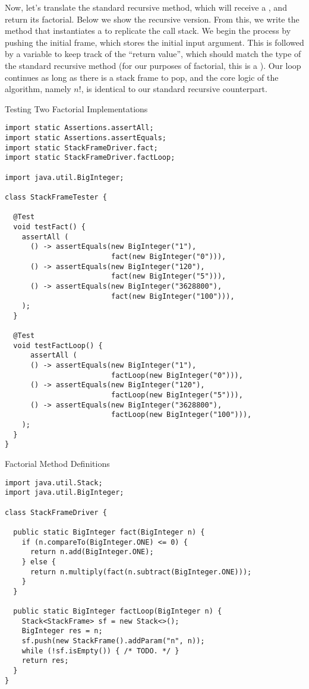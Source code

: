 Now, let's translate the standard recursive  method, which will receive a , and return its factorial. Below we show the recursive version. From this, we write the  method that instantiates a  to replicate the call stack. We begin the process by pushing the initial frame, which stores the initial input argument. This is followed by a variable to keep track of the ``return value'', which should match the type of the standard recursive method (for our purposes of factorial, this is a ). Our loop continues as long as there is a stack frame to pop, and the core logic of the algorithm, namely $n!$, is identical to our standard recursive counterpart.

\begin{cl}{Testing Two Factorial Implementations}
\begin{lstlisting}[language=MyJava]
import static Assertions.assertAll;
import static Assertions.assertEquals;
import static StackFrameDriver.fact;
import static StackFrameDriver.factLoop;

import java.util.BigInteger;

class StackFrameTester {

  @Test
  void testFact() {
    assertAll (
      () -> assertEquals(new BigInteger("1"), 
                         fact(new BigInteger("0"))),
      () -> assertEquals(new BigInteger("120"), 
                         fact(new BigInteger("5"))),
      () -> assertEquals(new BigInteger("3628800"), 
                         fact(new BigInteger("100"))),
    );
  }

  @Test
  void testFactLoop() {
      assertAll (
      () -> assertEquals(new BigInteger("1"), 
                         factLoop(new BigInteger("0"))),
      () -> assertEquals(new BigInteger("120"), 
                         factLoop(new BigInteger("5"))),
      () -> assertEquals(new BigInteger("3628800"), 
                         factLoop(new BigInteger("100"))),
    );
  }
}  
\end{lstlisting}
\end{cl}

\begin{cl}{Factorial Method Definitions}
\begin{lstlisting}[language=MyJava]
import java.util.Stack;
import java.util.BigInteger;

class StackFrameDriver {

  public static BigInteger fact(BigInteger n) {
    if (n.compareTo(BigInteger.ONE) <= 0) {
      return n.add(BigInteger.ONE);
    } else {
      return n.multiply(fact(n.subtract(BigInteger.ONE)));
    }
  }

  public static BigInteger factLoop(BigInteger n) {
    Stack<StackFrame> sf = new Stack<>();
    BigInteger res = n;
    sf.push(new StackFrame().addParam("n", n));
    while (!sf.isEmpty()) { /* TODO. */ }
    return res;
  }
}
\end{lstlisting}
\end{cl}

